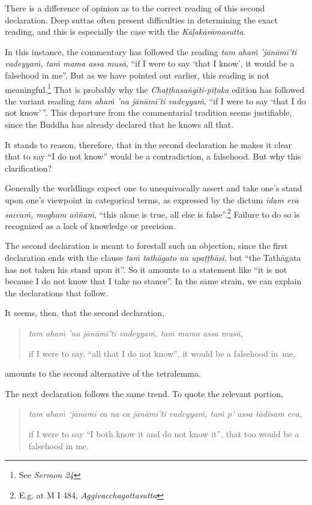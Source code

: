 There is a difference of opinion as to the correct reading of this second declaration. Deep suttas often present difficulties in determining the exact reading, and this is especially the case with the \emph{Kāḷakārāmasutta}.

In this instance, the commentary has followed the reading \emph{tam ahaṁ 'jānāmī'ti vadeyyaṁ, taṁ mama assa musā}, ``if I were to say `that I know', it would be a falsehood in me''. But as we have pointed out earlier, this reading is not meaningful.\footnote{See \emph{Sermon 24}} That is probably why the \emph{Chaṭṭhasaṅgīti-piṭaka} edition has followed the variant reading \emph{tam ahaṁ 'na jānāmī'ti vadeyyaṁ}, ``if I were to say `that I do not know'\,''. This departure from the commentarial tradition seems justifiable, since the Buddha has already declared that he knows all that.

It stands to reason, therefore, that in the second declaration he makes it clear that to say ``I do not know'' would be a contradiction, a falsehood. But why this clarification?

Generally the worldlings expect one to unequivocally assert and take one's stand upon one's viewpoint in categorical terms, as expressed by the dictum \emph{idam eva saccaṁ, mogham aññaṁ}, ``this alone is true, all else is false''.\footnote{E.g. at M I 484, \emph{Aggivacchagottasutta}} Failure to do so is recognized as a lack of knowledge or precision.

The second declaration is meant to forestall such an objection, since the first declaration ends with the clause \emph{taṁ tathāgato na upaṭṭhāsi}, but ``the Tathāgata has not taken his stand upon it''. So it amounts to a statement like ``it is not because I do not know that I take no stance''. In the same strain, we can explain the declarations that follow.

It seems, then, that the second declaration,

\begin{quote}
\emph{tam ahaṁ 'na jānāmī'ti vadeyyaṁ, taṁ mama assa musā},

if I were to say, ``all that I do not know'', it would be a falsehood in~me,
\end{quote}

amounts to the second alternative of the tetralemma.

The next declaration follows the same trend. To quote the relevant portion,

\begin{quote}
\emph{tam ahaṁ `jānāmi ca na ca jānāmī'ti vadeyyaṁ, taṁ p' assa tādisam eva,}

if I were to say ``I both know it and do not know it'', that too would be a falsehood in me.
\end{quote}

